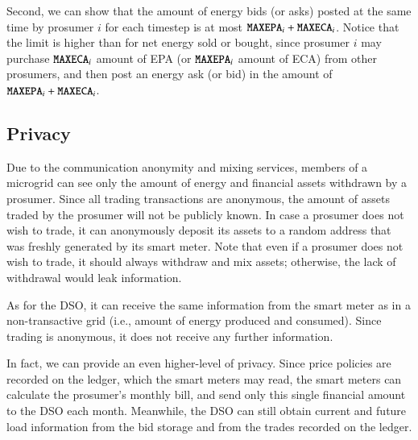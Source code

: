 Second, we can show that the amount of energy bids (or asks) posted at the same time by prosumer $i$ for each timestep is at most $\texttt{MAXEPA}_i + \texttt{MAXECA}_i$.
Notice that the limit is higher than for net energy sold or bought, since prosumer $i$ may purchase $\texttt{MAXECA}_i$ amount of EPA (or $\texttt{MAXEPA}_i$ amount of ECA) from other prosumers, and then post an energy ask (or bid) in the amount of $\texttt{MAXEPA}_i + \texttt{MAXECA}_i$.

\subsection{Privacy}

Due to the communication anonymity and mixing services, members of a microgrid can see only the amount of energy and financial assets withdrawn by a prosumer.
Since all trading transactions are anonymous, the amount of assets traded by the prosumer will not be publicly known.
In case a prosumer does not wish to trade, it can anonymously deposit its assets to a random address that was freshly generated by its smart meter.
Note that even if a prosumer does not wish to trade, it should always withdraw and mix assets; otherwise, the lack of withdrawal would leak information.

As for the DSO, it can receive the same information from the smart meter as in a non-transactive grid (i.e., amount of energy produced and consumed).
Since trading is anonymous, it does not receive any further information.

In fact, we can provide an even higher-level of privacy.
Since price policies are recorded on the ledger, which the smart meters may read, the smart meters can calculate the prosumer's monthly bill, and send only this single financial amount to the DSO each month.
Meanwhile, the DSO can still obtain current and future load information from the bid storage and from the trades recorded on the ledger.

